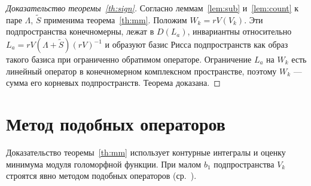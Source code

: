\documentclass[12pt,a4paper]{article}
\theoremstyle{definition}
\begin{document}
\begin{proof}[Доказательство теоремы~\ref{th:sign}]
Согласно леммам~\ref{lem:sub} и~\ref{lem:count} к паре $\Lambda$, $\tilde S$ применима
теорема~\ref{th:mm}. Положим $W_k=rV(V_k)$. Эти подпространства конечномерны, лежат в
$D(L_a)$, инвариантны относительно $L_a=rV(\Lambda+\tilde S)(rV)^{-1}$ и образуют базис
Рисса подпространств как образ такого базиса при ограниченно обратимом операторе.
Ограничение $L_a$ на $W_k$ есть линейный оператор в конечномерном комплексном
пространстве, поэтому $W_k$ --- сумма его корневых подпространств. Теорема доказана.
\end{proof}

\section{Метод подобных операторов}
Доказательство теоремы~\ref{th:mm} использует контурные интегралы и оценку минимума модуля
голоморфной функции. При малом $b_1$ подпространства $V_k$ строятся явно методом подобных
операторов (ср.~\cite{Pol}).
\end{document}
